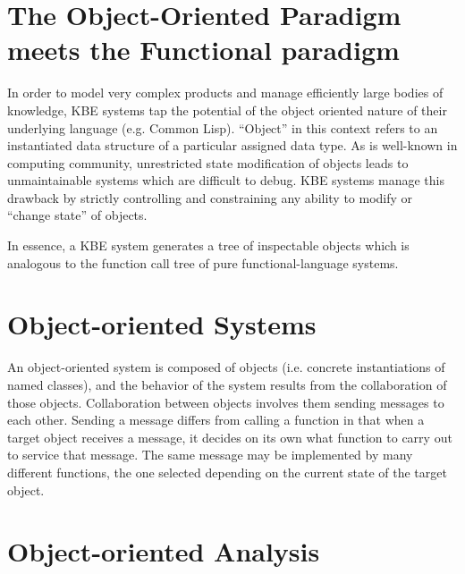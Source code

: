\documentclass [11pt]{book}
\begin{document}
\section{The Object-Oriented Paradigm meets the Functional paradigm}

\label{sec:theobject-orientedparadigmmeetsthefunctionalparadigm}

In order to model very complex products and manage efficiently
large bodies of knowledge, KBE systems tap the potential of the object
oriented nature of their underlying language (e.g. Common
Lisp). ``Object'' in this context refers to an instantiated data
structure of a particular assigned data type. As is well-known in
computing community, unrestricted state modification of objects leads
to unmaintainable systems which are difficult to debug. KBE systems
manage this drawback by strictly controlling and constraining
any ability to modify or ``change state'' of objects. 

In essence, a KBE system generates a tree of inspectable objects which
is analogous to the function call tree of pure functional-language
systems.

\section{Object-oriented Systems}

\label{sec:object-orientedsystems}

An object-oriented system is composed of
       objects (i.e. concrete instantiations of named classes), and
       the behavior of the system results from the collaboration of
       those objects. Collaboration between objects involves them
       sending messages to each other. Sending a message differs from
       calling a function in that when a target object receives a
       message, it decides on its own what function to carry out to
       service that message. The same message may be implemented by
       many different functions, the one selected depending on the
       current state of the target object.

\section{Object-oriented Analysis}

\label{sec:object-orientedanalysis}
\end{document}

